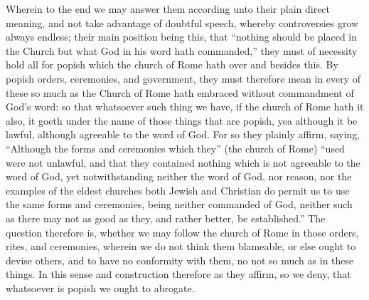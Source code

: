 Wherein to the end we may answer them according unto their plain direct meaning, and not take advantage of doubtful speech, whereby controversies grow always endless; their main position being this, that “nothing should be placed in the Church but what God in his word hath commanded,”  they must of necessity hold all for popish which the church of Rome hath over and besides this. By popish orders, ceremonies, and government, they must therefore mean in every of these so much as the Church of Rome hath embraced without commandment of God’s word: so that whatsoever such thing we have, if the church of Rome hath it also, it goeth under the name of those things that are popish, yea although it be lawful, although agreeable to the word of God. For so they plainly affirm, saying, “Although the forms and ceremonies which they” (the church of Rome) “used were not unlawful, and that they contained nothing which is not agreeable to the word of God, yet notwithstanding neither the word of God, nor reason, nor the examples of the eldest churches both Jewish and Christian do permit us to use the same forms and ceremonies, being neither commanded of God, neither such as there may not as good as they, and rather better, be established.” The question therefore is, whether we may follow the church of Rome in those orders, rites, and ceremonies, wherein we do not think them blameable, or else ought to devise others, and to have no conformity with them, no not so much as in these things. In this sense and construction therefore as they affirm, so we deny, that whatsoever is popish we ought to abrogate.

